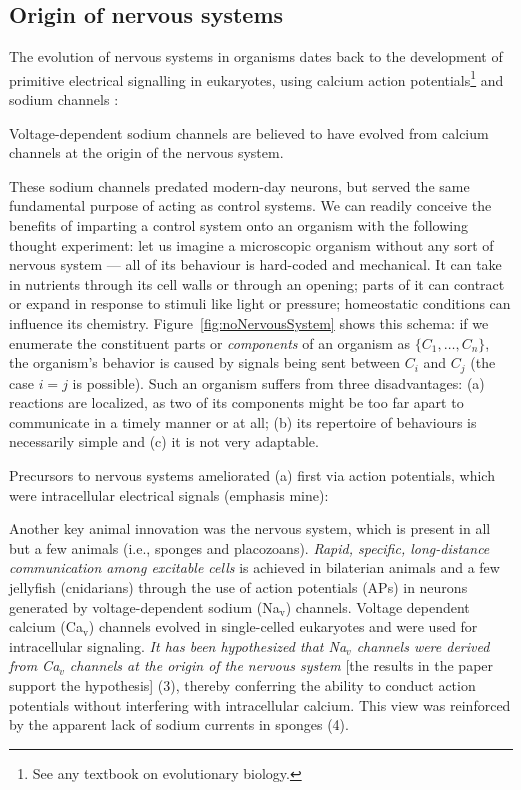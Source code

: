\subsection{Origin of nervous systems} The evolution of nervous systems in organisms dates back to the development of primitive electrical signalling in eukaryotes, using calcium action potentials\footnote{See any textbook on evolutionary biology.} and sodium channels \cite{Liebeskind31052011}:

\begin{emquote}
	Voltage-dependent sodium channels are believed to have evolved from calcium channels at the origin of the nervous system.
\end{emquote}

These sodium channels predated modern-day neurons, but served the same fundamental purpose of acting as control systems. We can readily conceive the benefits of imparting a control system onto an organism with the following thought experiment: let us imagine a microscopic organism without any sort of nervous system --- all of its behaviour is hard-coded and mechanical. It can take in nutrients through its cell walls or through an opening; parts of it can contract or expand in response to stimuli like light or pressure; homeostatic conditions can influence its chemistry. Figure~\ref{fig:noNervousSystem} shows this schema: if we enumerate the constituent parts or {\em components} of an organism as $\{C_1,\dots,C_n\}$, the organism's behavior is caused by signals being sent between $C_i$ and $C_j$ (the case $i=j$ is possible). Such an organism suffers from three disadvantages: (a) reactions are localized, as two of its components might be too far apart to communicate in a timely manner or at all; (b) its repertoire of behaviours is necessarily simple and (c) it is not very adaptable.

Precursors to nervous systems ameliorated (a) first via action potentials, which were intracellular electrical signals \cite{Liebeskind31052011} (emphasis mine):
\begin{emquote}
Another key animal innovation was the nervous system, which is present in all but a few animals (i.e., sponges and placozoans). {\em Rapid, specific, long-distance communication among excitable cells} is achieved in bilaterian animals and a few jellyfish (cnidarians) through the use of action potentials (APs) in neurons generated by voltage-dependent sodium (Na$_\mathrm{v}$) channels. Voltage dependent calcium (Ca$_\mathrm{v}$) channels evolved in single-celled eukaryotes and were used for intracellular signaling. {\em It has been hypothesized that Na$_v$ channels were derived from Ca$_v$ channels at the origin of the nervous system} \textsf{[the results in the paper support the hypothesis]} (3), thereby conferring the ability to conduct action potentials without interfering with intracellular calcium. This view was reinforced by the apparent lack of sodium currents in sponges (4).
\end{emquote}

